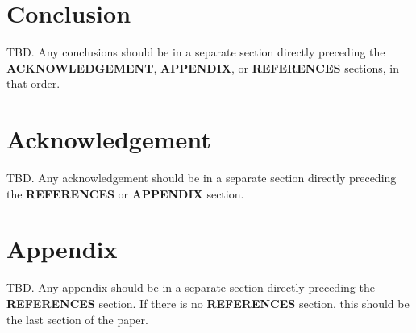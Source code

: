 \documentclass[a4paper,
               biblatex,       %
               keeplastbox,    %
               ]{jacow-2_1}    %
\newcommand\SEC[1]{\textbf{\uppercase{#1}}}
\begin{document}

\section{Conclusion} %
\label{sec:conclusion}
TBD. Any conclusions should be in a separate section directly preceding
the \SEC{Acknowledgement}, \SEC{Appendix}, or \SEC{References} sections, in that
order.


\section{Acknowledgement} %
\label{sec:acknowledgement}
TBD. Any acknowledgement should be in a separate section directly preceding
the \SEC{References} or \SEC{Appendix} section.


\section{Appendix} %
\label{sec:appendix}
TBD. Any appendix should be in a separate section directly preceding
the \SEC{References} section. If there is no \SEC{References} section,
this should be the last section of the paper.



\label{sec:references}
\printbibliography

\end{document}
